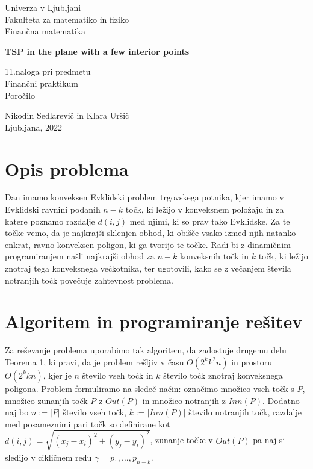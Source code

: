 \documentclass[a4paper, 11pt]{article}
\begin{document}
\begin{titlepage}
    \begin{center}
        \Large
        Univerza v Ljubljani\\
        Fakulteta za matematiko in fiziko\\
        Finančna matematika\\

        \vspace*{6cm}
        
        \Huge
        \textbf{TSP in the plane with a few interior points}

        \vspace*{3cm}

        \Large
        11.naloga pri predmetu\\
        Finančni praktikum\\
        Poročilo

        \vspace*{5cm}

        \Large
        Nikodin Sedlarevič in Klara Uršič\\
        Ljubljana, 2022
    \end{center}
\end{titlepage}

\section{Opis problema}

Dan imamo konveksen Evklidski problem trgovskega potnika, kjer imamo v Evklidski ravnini
podanih $n-k$ točk, ki ležijo v konveksnem položaju in za katere poznamo razdalje $d(i,j)$ med 
njimi, ki so prav tako Evklidske. Za te točke vemo, da je najkrajši sklenjen obhod, ki obišče vsako izmed njih
natanko enkrat, ravno konveksen poligon, ki ga tvorijo te točke. Radi bi z dinamičnim programiranjem 
našli najkrajši obhod za $n-k$ konveksnih točk in $k$ točk, ki ležijo znotraj tega konveksnega večkotnika, ter ugotovili, kako
se z večanjem števila notranjih točk povečuje zahtevnost problema.

\section{Algoritem in programiranje rešitev}
Za reševanje problema uporabimo tak algoritem, da zadostuje drugemu delu Teorema 1, ki pravi, da je problem 
rešljiv v času $O(2^kk^2n)$ in prostoru $O(2^kkn)$, kjer je $n$ število vseh točk in 
$k$ število točk znotraj konveksnega poligona. Problem formuliramo na sledeč način: označimo množico vseh točk s $P$, množico zunanjih točk $P$ z
$Out(P)$ in množico notranjih z $Inn(P)$. Dodatno naj bo $n:=|P|$ število vseh točk, $k:=|Inn(P)|$ število notranjih točk, razdalje med posameznimi
pari točk so definirane kot $d(i,j) = \sqrt{(x_j-x_i)^2 + (y_j-y_i)^2}$, zunanje točke v $Out(P)$ pa naj si sledijo v cikličnem redu 
$\gamma = p_1,\ldots,p_{n-k}$.\\
\end{document}
